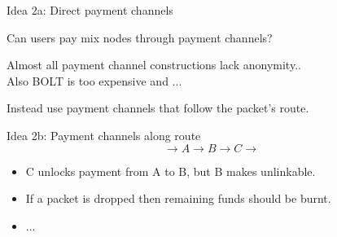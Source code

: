 \documentclass[fleqn,xcolor={usenames,dvipsnames},notes,aspectratio=169]{beamer} %
\begin{document}
\begin{frame}{Idea 2a: Direct payment channels}

Can users pay mix nodes through payment channels?

\bigskip\bigskip

Almost all payment channel constructions lack anonymity.. \\ \smallskip
\hspace{3pt}  Also BOLT is too expensive and ...

\bigskip\bigskip

Instead use payment channels that follow the packet's route.

\end{frame}


\begin{frame}{Idea 2b: Payment channels along route}
$$ \longrightarrow A \longrightarrow B \longrightarrow C \longrightarrow $$

\begin{itemize}
\item C unlocks payment from A to B, but B makes unlinkable.
\item If a packet is dropped then remaining funds should be burnt.
\item ...
\end{itemize}

\end{frame}

\end{document}
